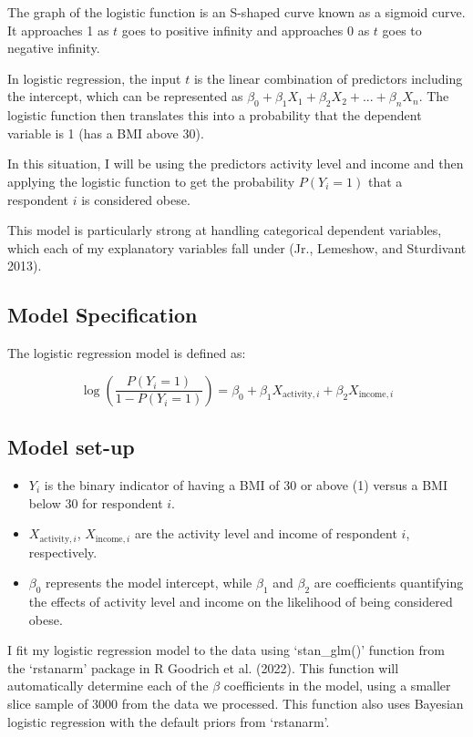 \documentclass[
  letterpaper,
  DIV=11,
  numbers=noendperiod]{scrartcl}
\providecommand{\tightlist}{%
  \setlength{\itemsep}{0pt}\setlength{\parskip}{0pt}}\usepackage{longtable,booktabs,array}
\begin{document}
The graph of the logistic function is an S-shaped curve known as a
sigmoid curve. It approaches 1 as \(t\) goes to positive infinity and
approaches 0 as \(t\) goes to negative infinity.

In logistic regression, the input \(t\) is the linear combination of
predictors including the intercept, which can be represented as
\(\beta_0 + \beta_1X_1 + \beta_2X_2 + ... + \beta_nX_n\). The logistic
function then translates this into a probability that the dependent
variable is 1 (has a BMI above 30).

In this situation, I will be using the predictors activity level and
income and then applying the logistic function to get the probability
\(P(Y_i=1)\) that a respondent \(i\) is considered obese.

This model is particularly strong at handling categorical dependent
variables, which each of my explanatory variables fall under (Jr.,
Lemeshow, and Sturdivant 2013).

\hypertarget{model-specification}{%
\subsection{Model Specification}\label{model-specification}}

The logistic regression model is defined as:

\[
\log\left(\frac{P(Y_i=1)}{1 - P(Y_i=1)}\right) = \beta_0 + \beta_1X_{\text{activity},i} + \beta_2X_{\text{income},i}
\]

\hypertarget{model-set-up}{%
\subsection{Model set-up}\label{model-set-up}}

\begin{itemize}
\tightlist
\item
  \(Y_i\) is the binary indicator of having a BMI of 30 or above (1)
  versus a BMI below 30 for respondent \(i\).
\item
  \(X_{\text{activity},i}\), \(X_{\text{income},i}\) are the activity
  level and income of respondent \(i\), respectively.
\item
  \(\beta_0\) represents the model intercept, while \(\beta_1\) and
  \(\beta_2\) are coefficients quantifying the effects of activity level
  and income on the likelihood of being considered obese.
\end{itemize}

I fit my logistic regression model to the data using `stan\_glm()'
function from the `rstanarm' package in R Goodrich et al. (2022). This
function will automatically determine each of the \(\beta\) coefficients
in the model, using a smaller slice sample of 3000 from the data we
processed. This function also uses Bayesian logistic regression with the
default priors from `rstanarm'.
\end{document}
